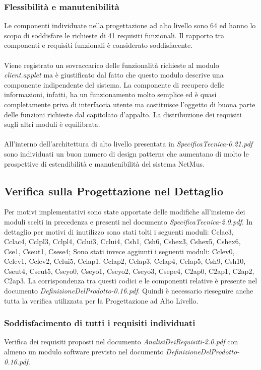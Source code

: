 \subsubsection*{Flessibilit\`a e manutenibilit\`a} 
Le componenti individuate nella
progettazione ad alto livello sono 64 ed hanno lo scopo di soddisfare le
richieste di 41 requisiti funzionali. Il rapporto tra componenti e requisiti
funzionali \`e considerato soddisfacente. \\\\ 
Viene registrato un sovraccarico delle funzionalit\`a richieste al modulo
\emph{client.applet} ma \`e giustificato dal fatto che questo modulo descrive
una componente indipendente del sistema. La componente di recupero delle
informazioni, infatti, ha un funzionamento molto semplice ed \`e quasi
completamente priva di interfaccia utente ma costituisce l'oggetto di buona
parte delle funzioni richieste dal capitolato d'appalto. La distribuzione dei
requisiti sugli altri moduli \`e equilibrata.\\\\
All'interno dell'architettura di alto livello presentata in
\emph{SpecificaTecnica-0.21.pdf} sono individuati un buon numero di design
patterns che aumentano di molto le prospettive di estendibilit\`a e
manutenibilit\`a del sistema NetMus.

\subsection{Verifica sulla Progettazione nel Dettaglio}
Per motivi implementativi sono state apportate delle modifiche all'insieme dei
moduli scelti in precedenza e presenti nel documento
\emph{SpecificaTecnica-2.0.pdf}. In dettaglio per motivi di
inutilizzo sono stati tolti i seguenti moduli: Cclac3, Cclac4, Cclpl3, Cclpl4,
Cclui3, Cclui4, Csh1, Csh6, Cshex3, Cshex5, Cshex6, Cse1, Cseut1, Csese4;
Sono stati invece aggiunti i seguenti moduli: Cclev0,
Cclev1, Cclev2, Cclui5, Cclap1, Cclap2, Cclap3, Cclap4, Cclap5, Csh9, Csh10,
Cseut4, Cseut5, Cseyo0, Cseyo1, Cseyo2, Cseyo3, Csepe4, C2ap0, C2ap1, C2ap2,
C2ap3. La corrispondenza tra questi codici e le componenti relative \`e presente
nel documento \emph{DefinizioneDelProdotto-0.16.pdf}.
Quindi \`e necessario rieseguire anche tutta la verifica utilizzata per la
Progettazione ad Alto Livello.

\subsubsection*{Soddisfacimento di tutti i requisiti individuati}
Verifica dei requisiti proposti nel documento \emph{AnalisiDeiRequisiti-2.0.pdf}
con almeno un modulo software previsto nel documento
\emph{DefinizioneDelProdotto-0.16.pdf}.

